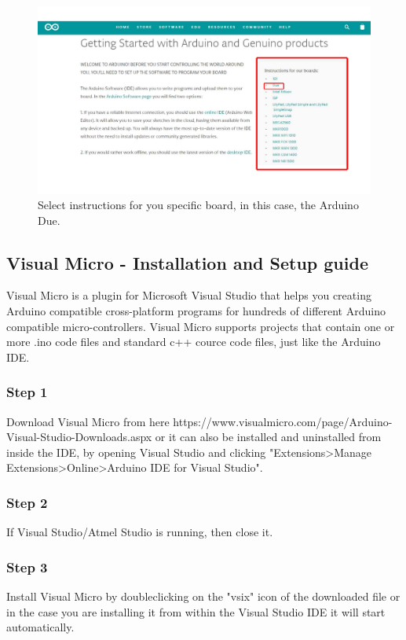 \begin{refsection}
	\begin{figure}[H]
		\centering
		\includegraphics[width=1\linewidth]{./sdf/arduino_quantum_rx/figures/arduinoBoards.pdf}
		\caption{Select instructions for you specific board, in this case, the Arduino Due.}
		\label{arduinoDownload}
	\end{figure}
	
	\subsection{Visual Micro - Installation and Setup guide}
	Visual Micro is a plugin for Microsoft Visual Studio that helps you creating Arduino compatible cross-platform programs for hundreds of different Arduino compatible micro-controllers. Visual Micro supports projects that contain one or more .ino code files and standard c++ cource code files, just like the Arduino IDE.
	
	
	\subsubsection{Step 1}
	Download Visual Micro from here https://www.visualmicro.com/page/Arduino-Visual-Studio-Downloads.aspx or it can also be installed and uninstalled from inside the IDE, by opening Visual Studio and clicking "Extensions>Manage Extensions>Online>Arduino IDE for Visual Studio".
	
	\subsubsection{Step 2}
	If Visual Studio/Atmel Studio is running, then close it.
	
	\subsubsection{Step 3}
	Install Visual Micro by doubleclicking on the "vsix" icon of the downloaded file or in the case you are installing it from within the Visual Studio IDE it will start automatically.
	

\end{refsection}
